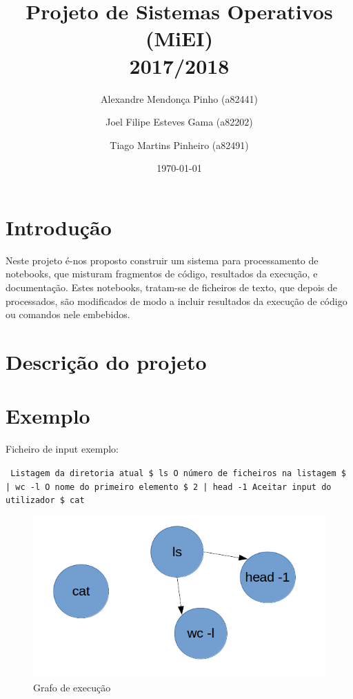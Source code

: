 \documentclass[12pt]{report}
\title{Projeto de Sistemas Operativos (MiEI) \\ 2017/2018}
\author{Alexandre Mendonça Pinho (a82441) \and Joel Filipe Esteves Gama (a82202) \and Tiago Martins Pinheiro (a82491)}
\date{\today}
\newcommand\tab[1][0.5cm]{\hspace*{#1}}
\begin{document}
\maketitle

\tableofcontents

\chapter{Introdução}
\label{sec:introducao}

\tab Neste projeto é-nos proposto construir um sistema para processamento de notebooks, que misturam fragmentos de código, resultados da execução, e documentação. Estes notebooks, tratam-se de ficheiros de texto, que depois de processados, são modificados de modo a incluir resultados da execução de código ou comandos nele embebidos.

\chapter{Descrição do projeto}
\label{sec:descricao}

\chapter{Exemplo}
\label{sec:exemplo}

Ficheiro de input exemplo:

\texttt{
\newline
    Listagem da diretoria atual\newline
    \$ ls\newline
\newline
    O número de ficheiros na listagem\newline
    \$ | wc -l\newline
\newline
    O nome do primeiro elemento\newline
    \$ 2 | head -1\newline
\newline
    Aceitar input do utilizador\newline
    \$ cat
}

\begin{figure}
    \includegraphics[width=\linewidth]{grafo_execucao_exemplo.png}
    \caption{Grafo de execução}
    \label{fig:grafo_execucao}
\end{figure}
\end{document}
